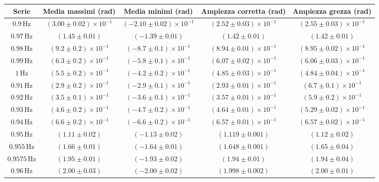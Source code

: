 \documentclass{article}
\begin{document}
\begin{table}[H]
\small
\centering
\begin{tabular}{|c|c|c|c|c|}
\toprule
\textbf{Serie} & \textbf{Media massimi (rad)} & \textbf{Media minimi (rad)} & \textbf{Ampiezza corretta (rad)} & \textbf{Ampiezza grezza (rad)} \\
\midrule
$0.9\,\text{Hz}$ & $(3.00 \pm 0.02) \times 10^{-1}$ & $(-2.10 \pm 0.02) \times 10^{-1}$ & $(2.52 \pm 0.03) \times 10^{-1}$ & $(2.55 \pm 0.03) \times 10^{-1}$ \\
$0.97\,\text{Hz}$ & $(1.45 \pm 0.01)$ & $(-1.39 \pm 0.01)$ & $(1.42 \pm 0.01)$ & $(1.42 \pm 0.01)$ \\
$0.98\,\text{Hz}$ & $(9.2 \pm 0.2) \times 10^{-1}$ & $(-8.7 \pm 0.1) \times 10^{-1}$ & $(8.94 \pm 0.01) \times 10^{-1}$ & $(8.95 \pm 0.02) \times 10^{-1}$ \\
$0.99\,\text{Hz}$ & $(6.3 \pm 0.2) \times 10^{-1}$ & $(-5.8 \pm 0.1) \times 10^{-1}$ & $(6.07 \pm 0.02) \times 10^{-1}$ & $(6.06 \pm 0.03) \times 10^{-1}$ \\
$1\,\text{Hz}$ & $(5.5 \pm 0.2) \times 10^{-1}$ & $(-4.2 \pm 0.2) \times 10^{-1}$ & $(4.85 \pm 0.03) \times 10^{-1}$ & $(4.84 \pm 0.04) \times 10^{-1}$ \\
\midrule
$0.91\,\text{Hz}$ & $(2.9 \pm 0.2) \times 10^{-1}$ & $(-2.9 \pm 0.1) \times 10^{-1}$ & $(2.93 \pm 0.01) \times 10^{-1}$ & $(6.7 \pm 0.1) \times 10^{-1}$ \\
$0.92\,\text{Hz}$ & $(3.5 \pm 0.1) \times 10^{-1}$ & $(-3.6 \pm 0.1) \times 10^{-1}$ & $(3.57 \pm 0.01) \times 10^{-1}$ & $(5.9 \pm 0.2) \times 10^{-1}$ \\
$0.93\,\text{Hz}$ & $(4.6 \pm 0.2) \times 10^{-1}$ & $(-4.7 \pm 0.2) \times 10^{-1}$ & $(4.64 \pm 0.01) \times 10^{-1}$ & $(5.29 \pm 0.02) \times 10^{-1}$ \\
$0.94\,\text{Hz}$ & $(6.6 \pm 0.2) \times 10^{-1}$ & $(-6.6 \pm 0.2) \times 10^{-1}$ & $(6.57 \pm 0.01) \times 10^{-1}$ & $(6.57 \pm 0.02) \times 10^{-1}$ \\
$0.95\,\text{Hz}$ & $(1.11 \pm 0.02)$ & $(-1.13 \pm 0.02)$ & $(1.119 \pm 0.001)$ & $(1.12 \pm 0.02)$ \\
$0.955\,\text{Hz}$ & $(1.66 \pm 0.01)$ & $(-1.64 \pm 0.01)$ & $(1.648 \pm 0.001)$ & $(1.65 \pm 0.04)$ \\
$0.9575\,\text{Hz}$ & $(1.95 \pm 0.01)$ & $(-1.93 \pm 0.02)$ & $(1.94 \pm 0.01)$ & $(1.94 \pm 0.04)$ \\
$0.96\,\text{Hz}$ & $(2.00 \pm 0.03)$ & $(-2.00 \pm 0.02)$ & $(1.998 \pm 0.002)$ & $(2.00 \pm 0.01)$ \\

\end{tabular}
\end{table}
\end{document}
